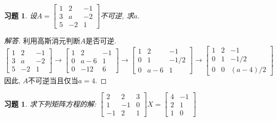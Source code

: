 \documentclass[UTF8]{ctexart}
\newtheorem{ex}[thm]{习题}
\begin{document}
\begin{ex}
设$A = \begin{bmatrix} 1 & 2 & -1\\ 3 & a & -2 \\ 5 & -2 & 1  \end{bmatrix}$不可逆, 求$a.$
\end{ex}
\begin{proof}[解答]
利用高斯消元判断$A$是否可逆.
\[
\begin{bmatrix} 1 & 2 & -1\\ 3 & a & -2 \\ 5 & -2 & 1  \end{bmatrix} \to \begin{bmatrix} 1 & 2 & -1\\ 0 & a-6 & 1 \\ 0 & -12 & 6  \end{bmatrix} \to \begin{bmatrix} 1 & 2 & -1\\ 0 & 1 & -1/2 \\ 0 & a-6 & 1  \end{bmatrix} \to \begin{bmatrix} 1 & 2 & -1\\ 0 & 1 & -1/2 \\ 0 & 0 & (a-4)/2  \end{bmatrix}
\]
因此, $A$不可逆当且仅当$a=4.$
\end{proof}



\begin{ex}
求下列矩阵方程的解: $\begin{bmatrix} 2 & 2 & 3\\ 1 & -1 & 0 \\ -1 & 2 & 1  \end{bmatrix} X = \begin{bmatrix} 4 & -1 \\ 2 & 1  \\ 1 & 0  \end{bmatrix}$
\end{ex}
\end{document}
